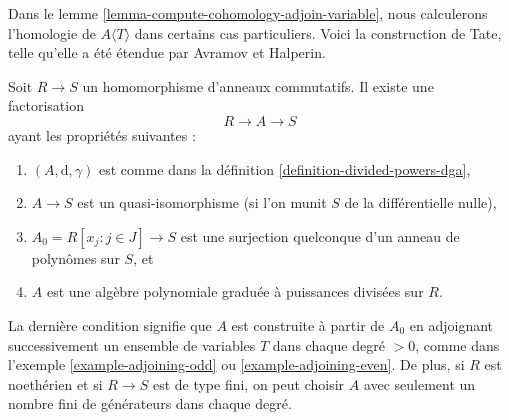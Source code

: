 \noindent
Dans le lemme \ref{lemma-compute-cohomology-adjoin-variable}, nous calculerons
l'homologie de $A\langle T \rangle$ dans certains cas particuliers. Voici la
construction de Tate, telle qu'elle a été étendue par Avramov et Halperin.

\begin{lemma}
\label{lemma-tate-resolution}
Soit $R \to S$ un homomorphisme d'anneaux commutatifs. Il existe une
factorisation
$$
R \to A \to S
$$
ayant les propriétés suivantes :
\begin{enumerate}
\item $(A, \text{d}, \gamma)$ est comme dans la définition
\ref{definition-divided-powers-dga},
\item $A \to S$ est un quasi-isomorphisme (si l'on munit $S$ de la
différentielle nulle),
\item $A_0 = R[x_j: j\in J] \to S$ est une surjection quelconque d'un anneau
de polynômes sur $S$, et
\item $A$ est une algèbre polynomiale graduée à puissances divisées sur $R$.
\end{enumerate}
La dernière condition signifie que $A$ est construite à partir de $A_0$ en
adjoignant successivement un ensemble de variables $T$ dans chaque degré
$> 0$, comme dans l'exemple \ref{example-adjoining-odd} ou
\ref{example-adjoining-even}. De plus, si $R$ est noethérien et si
$R\to S$ est de type fini, on peut choisir $A$ avec seulement un nombre fini
de générateurs dans chaque degré.
\end{lemma}

